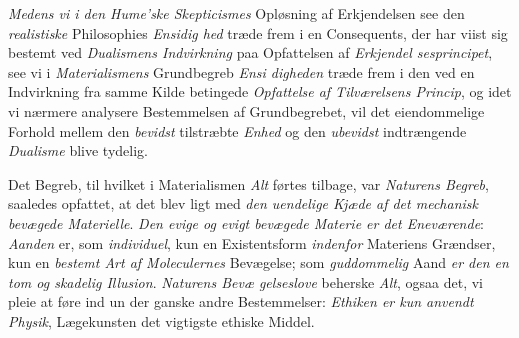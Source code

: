 
\emph{Medens vi i den Hume'ske Skepticismes} Opløsning
af Erkjendelsen see den \emph{realistiske} Philosophies \emph{Ensidig\-%
hed} træde frem i en Consequents, der har viist sig bestemt
ved \emph{Dualismens Indvirkning} paa Opfattelsen af \emph{Erkjendel\-%
sesprincipet}, see vi i \emph{Materialismens} Grundbegreb \emph{Ensi\-%
digheden} træde frem i den ved en Indvirkning fra samme Kilde
betingede \emph{Opfattelse af Tilværelsens Princip}, og idet
vi nærmere analysere Bestemmelsen af Grundbegrebet, vil
det eiendommelige Forhold mellem den \emph{bevidst} tilstræbte
\emph{Enhed} og den \emph{ubevidst} indtrængende \emph{Dualisme} blive
tydelig.

Det Begreb, til hvilket i Materialismen \emph{Alt} førtes tilbage,
var \emph{Naturens Begreb}, saaledes opfattet, at det blev ligt med
\emph{den uendelige Kjæde af det mechanisk bevægede
Materielle}. \emph{Den evige og evigt bevægede Materie er
det Eneværende}: \emph{Aanden} er, som \emph{individuel}, kun en
Existentsform \emph{indenfor} Materiens Grændser, kun en \emph{bestemt
Art af Moleculernes} Bevægelse; som \emph{guddommelig} Aand
\emph{er den en tom og skadelig Illusion}. \emph{Naturens Bevæ\-%
gelseslove} beherske \emph{Alt}, ogsaa det, vi pleie at føre ind un\-%
der ganske andre Bestemmelser: \emph{Ethiken er kun anvendt
Physik}, Lægekunsten det vigtigste ethiske Middel.

